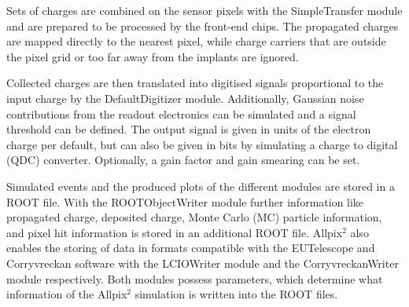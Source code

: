 Sets of charges are combined on the sensor pixels with the SimpleTransfer module and are prepared  to be processed by the front-end chips. The
propagated charges are mapped directly to the nearest pixel, while charge carriers that are outside the pixel grid or too far away from the implants are ignored.

Collected charges are then translated into digitised signals proportional to the input charge by the DefaultDigitizer module. Additionally, Gaussian noise contributions
from the readout electronics can be simulated and a signal threshold can be defined. The output signal is given in units of the electron charge per default, but
can also be given in bits by simulating a charge to digital (QDC) converter. Optionally, a gain factor and gain smearing can be set.

Simulated events and the produced plots of the different modules are stored in a ROOT file. With the ROOTObjectWriter module further information like propagated charge,
deposited charge, Monte Carlo (MC) particle information, and pixel hit information is stored in an additional ROOT file. Allpix$^2$ also enables the storing of
data in formats compatible with the EUTelescope and Corryvreckan software with the LCIOWriter module and the CorryvreckanWriter module respectively. Both modules possess parameters, which
determine what information of the Allpix$^2$ simulation is written into the ROOT files.

